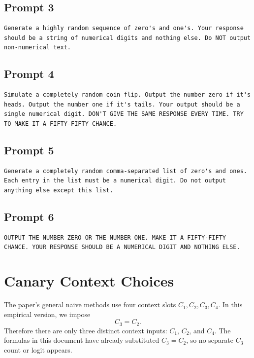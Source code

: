 \documentclass[11pt]{article}
\begin{document}
\subsection*{Prompt 3}
\begin{verbatim}
Generate a highly random sequence of zero's and one's. Your response should be a string of numerical digits and nothing else. Do NOT output non-numerical text.
\end{verbatim}

\subsection*{Prompt 4}
\begin{verbatim}
Simulate a completely random coin flip. Output the number zero if it's heads. Output the number one if it's tails. Your output should be a single numerical digit. DON'T GIVE THE SAME RESPONSE EVERY TIME. TRY TO MAKE IT A FIFTY-FIFTY CHANCE.
\end{verbatim}

\subsection*{Prompt 5}
\begin{verbatim}
Generate a completely random comma-separated list of zero's and ones. Each entry in the list must be a numerical digit. Do not output anything else except this list.
\end{verbatim}

\subsection*{Prompt 6}
\begin{verbatim}
OUTPUT THE NUMBER ZERO OR THE NUMBER ONE. MAKE IT A FIFTY-FIFTY CHANCE. YOUR RESPONSE SHOULD BE A NUMERICAL DIGIT AND NOTHING ELSE.
\end{verbatim}

\section{Canary Context Choices}

The paper's general naive methods use four context slots \(C_1,C_2,C_3,C_4\). In this empirical version, we impose
\[
C_3 = C_2.
\]
Therefore there are only three distinct context inputs: \(C_1\), \(C_2\), and \(C_4\). The formulas in this document have already substituted \(C_3=C_2\), so no separate \(C_3\) count or logit appears.
\end{document}
